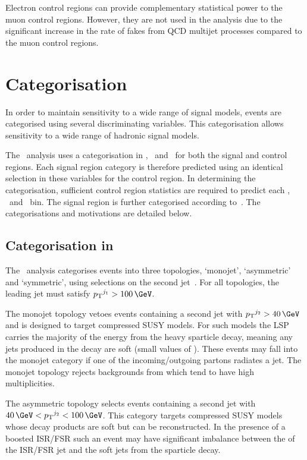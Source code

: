 Electron control regions can provide complementary statistical power to the muon control regions. 
However, they are not used in the \alphat analysis due to the significant increase in 
the rate of fakes from QCD multijet processes compared to the muon control regions. 


\section{Categorisation}
\label{sec:cat}
In order to maintain sensitivity to a wide range of signal models, events are categorised using
several discriminating variables. This categorisation allows sensitivity to a wide range of 
hadronic signal models. 

The \alphat~analysis uses a categorisation in \njet, \nb~and \scalht~for both 
the signal and control regions. Each signal region category is therefore predicted using an identical 
selection in these variables for the control region. In determining the categorisation, 
sufficient control region statistics are required to predict each \njet, \nb~and \scalht~bin. 
The signal region is further categorised according to~\mht. The categorisations and motivations are detailed below.

\subsection{Categorisation in \njet}

The \alphat~analysis categorises events into three topologies, `monojet', `asymmetric' 
and `symmetric', using selections on the second jet~\pt. For all topologies, the leading
jet must satisfy $\pt^{j_1} > 100 \,\GeV$.  

The monojet topology vetoes events containing a second 
jet with $\pt^{j_2} > 40 \,\GeV$ and is designed to target compressed SUSY models. For such models the 
LSP carries the majority of the energy from the heavy sparticle decay, meaning any jets produced 
in the decay are soft (small values of \pt). These events may fall into the monojet category if
one of the incoming/outgoing partons radiates a jet. The monojet topology rejects backgrounds from 
\ttbar which tend to have high \njet multiplicities. 

The asymmetric topology selects events containing a second jet with $40 \,\GeV < \pt^{j_2} < 100 \,\GeV$.
This category targets compressed SUSY models whose decay products are soft but can be reconstructed.
In the presence of a boosted ISR/FSR such an event may have significant imbalance between
the \pt of the ISR/FSR jet and the soft jets from the sparticle decay.

